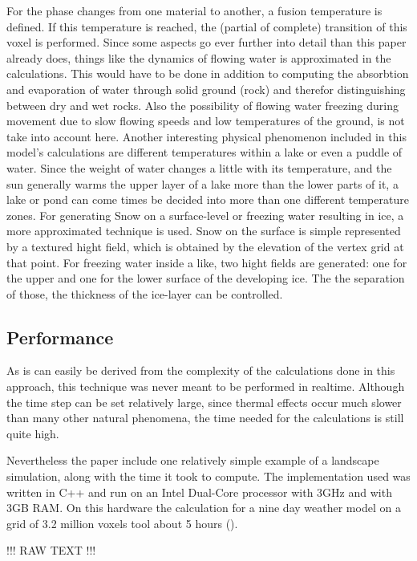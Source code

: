 For the phase changes from one material to another, a fusion temperature is defined. If this temperature is reached, the (partial of complete) transition of this voxel is performed. Since some aspects go ever further into detail than this paper already does, things like the dynamics of flowing water is approximated in the calculations. This would have to be done in addition to computing the absorbtion and evaporation of water through solid ground (rock) and therefor distinguishing between dry and wet rocks. Also the possibility of flowing water freezing during movement due to slow flowing speeds and low temperatures of the ground, is not take into account here. Another interesting physical phenomenon included in this model’s calculations are different temperatures within a lake or even a puddle of water. Since the weight of water changes a little with its temperature, and the sun generally warms the upper layer of a lake more than the lower parts of it, a lake or pond can come times be decided into more than one different temperature zones.
For generating Snow on a surface-level or freezing water resulting in ice, a more approximated technique is used. Snow on the surface is simple represented by a textured hight field, which is obtained by the elevation of the vertex grid at that point. For freezing water inside a like, two hight fields are generated: one for the upper and one for the lower surface of the developing ice. The the separation of those, the thickness of the ice-layer can be controlled.

\subsection{Performance}
As is can easily be derived from the complexity of the calculations done in this approach, this technique was never meant to be performed in realtime. Although the time step can be set relatively large, since thermal effects occur much slower than many other natural phenomena, the time needed for the calculations is still quite high.

Nevertheless the paper include one relatively simple example of a landscape simulation, along with the time it took to compute. The implementation used was written in C++ and run on an Intel Dual-Core processor with 3GHz and with 3GB RAM. On this hardware the calculation for a nine day weather model on a grid of 3.2 million voxels tool about 5 hours ().

!!! RAW TEXT !!!